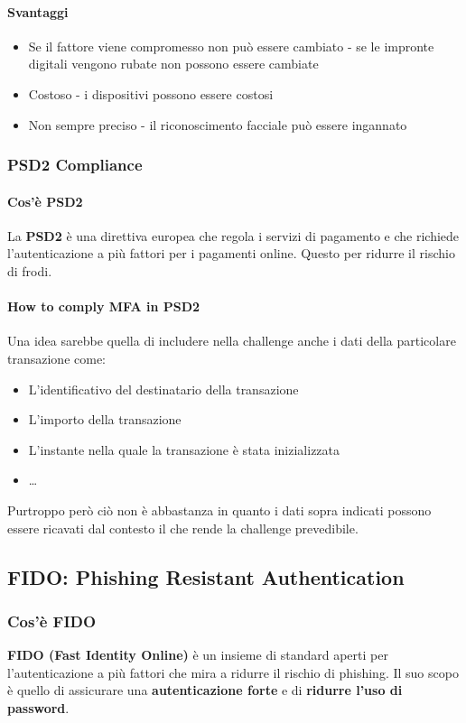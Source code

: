            \paragraph{Svantaggi}
                \begin{itemize}
                    \item Se il fattore viene compromesso non può essere cambiato - se le impronte digitali vengono rubate non possono essere cambiate
                    \item Costoso - i dispositivi possono essere costosi
                    \item Non sempre preciso - il riconoscimento facciale può essere ingannato
                \end{itemize}
        \subsubsection{PSD2 Compliance}
            \paragraph{Cos'è PSD2} La \textbf{PSD2} è una direttiva europea che regola i servizi di pagamento e che richiede l'autenticazione a più fattori per i pagamenti online. Questo per ridurre il rischio di frodi.
            \paragraph{How to comply MFA in PSD2} Una idea sarebbe quella di includere nella challenge anche i dati della particolare transazione come:
                \begin{itemize}
                    \item L'identificativo del destinatario della transazione
                    \item L'importo della transazione
                    \item L'instante nella quale la transazione è stata inizializzata
                    \item \dots
                \end{itemize}
            Purtroppo però ciò non è abbastanza in quanto i dati sopra indicati possono essere ricavati dal contesto il che rende la challenge prevedibile.
    \subsection{FIDO: Phishing Resistant Authentication}
        \subsubsection{Cos'è FIDO}
            \textbf{FIDO (Fast Identity Online)} è un insieme di standard aperti per l'autenticazione a più fattori che mira a ridurre il rischio di phishing. Il suo scopo è quello di assicurare una \textbf{autenticazione forte} e di \textbf{ridurre l'uso di password}.
